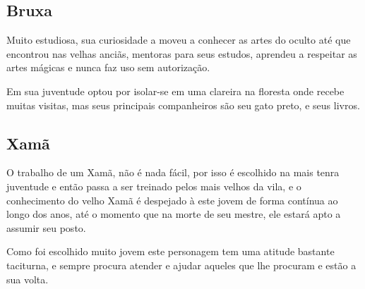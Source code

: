 
\subsection{Bruxa}
Muito estudiosa, sua curiosidade a moveu a conhecer as artes do oculto até que encontrou nas velhas anciãs, mentoras para seus estudos, aprendeu a respeitar as artes mágicas e nunca faz uso sem autorização. 

Em sua juventude optou por isolar-se em uma clareira na floresta onde recebe muitas visitas, mas seus principais companheiros são seu gato preto, e seus livros.






\subsection{Xamã}
O trabalho de um Xamã, não é nada fácil, por isso é escolhido na mais tenra juventude e então passa a ser treinado pelos mais velhos da vila, e o conhecimento do velho Xamã é despejado à este jovem de forma contínua ao longo dos anos, até o momento que na morte de seu mestre, ele estará apto a assumir seu posto.

Como foi escolhido muito jovem este personagem tem uma atitude bastante taciturna, e sempre procura atender e ajudar aqueles que lhe procuram e estão a sua volta.




